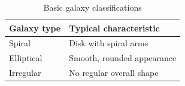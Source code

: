 \begin{table}[htbp]
    \centering
    \caption{Basic galaxy classifications}
    \label{tab:galaxy-types}
    \begin{tabular}{ll}
        \toprule
        Galaxy type & Typical characteristic \\
        \midrule
        Spiral & Disk with spiral arms \\
        Elliptical & Smooth, rounded appearance \\
        Irregular & No regular overall shape \\
        \bottomrule
    \end{tabular}
\end{table}